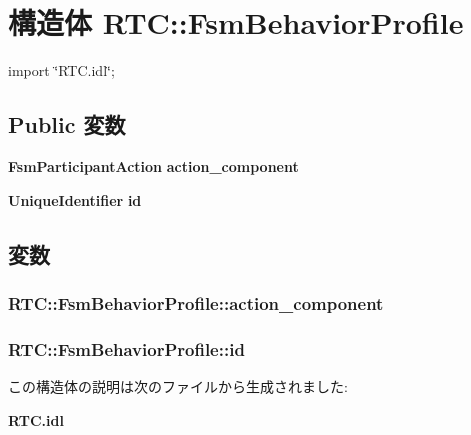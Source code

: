 \section{構造体 RTC::FsmBehaviorProfile}
\label{structRTC_1_1FsmBehaviorProfile}


{\ttfamily import \char`\"{}RTC.idl\char`\"{};}

\subsection*{Public 変数}
\begin{DoxyCompactItemize}
\item 
{\bf FsmParticipantAction} {\bf action\_\-component}
\item 
{\bf UniqueIdentifier} {\bf id}
\end{DoxyCompactItemize}


\subsection{変数}
\subsubsection[{action\_\-component}]{ {\bf RTC::FsmBehaviorProfile::action\_\-component}}\label{structRTC_1_1FsmBehaviorProfile_acade0f218ed2bda5766f29609b35f3b6}
\subsubsection[{id}]{ {\bf RTC::FsmBehaviorProfile::id}}\label{structRTC_1_1FsmBehaviorProfile_a6b2f6efca3063fd7bbdea7a934aaec60}


この構造体の説明は次のファイルから生成されました:\begin{DoxyCompactItemize}
\item 
{\bf RTC.idl}\end{DoxyCompactItemize}
